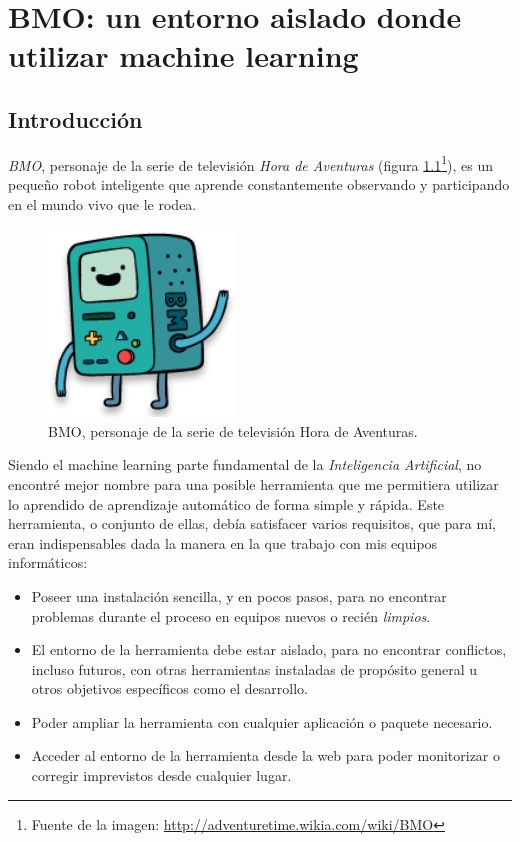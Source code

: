 \chapter{BMO: un entorno aislado donde utilizar machine learning} \label{chap:4}

\vspace*{5mm}

\section{Introducción} \label{sec:4.1}

\emph{BMO}, personaje de la serie de televisión \emph{Hora de Aventuras} (figura \ref{fig:4.1}\footnote{Fuente de la imagen: \url{http://adventuretime.wikia.com/wiki/BMO}}), es un pequeño robot inteligente que aprende constantemente observando y participando en el mundo vivo que le rodea.

\begin{figure}[ht]
  \centering
  \includegraphics[width=50mm]{figures/ch_04/bmo_adventure_time.png}
  \caption{BMO, personaje de la serie de televisión Hora de Aventuras.}
  \label{fig:4.1}
\end{figure}

Siendo el machine learning parte fundamental de la \emph{Inteligencia Artificial}, no encontré mejor nombre para una posible herramienta que me permitiera utilizar lo aprendido de aprendizaje automático de forma simple y rápida. Este herramienta, o conjunto de ellas, debía satisfacer varios requisitos, que para mí, eran indispensables dada la manera en la que trabajo con mis equipos informáticos:

\begin{itemize}
\item[\textbullet] Poseer una instalación sencilla, y en pocos pasos, para no encontrar problemas durante el proceso en equipos nuevos o recién \emph{limpios}.

\item[\textbullet] El entorno de la herramienta debe estar aislado, para no encontrar conflictos, incluso futuros, con otras herramientas instaladas de propósito general u otros objetivos específicos como el desarrollo.

\item[\textbullet] Poder ampliar la herramienta con cualquier aplicación o paquete necesario.

\item[\textbullet] Acceder al entorno de la herramienta desde la web para poder monitorizar o corregir imprevistos desde cualquier lugar.
\end{itemize}

